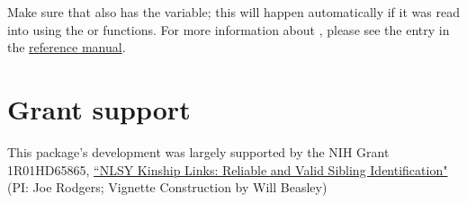 \documentclass{article}\usepackage[]{graphicx}\usepackage[]{color}
\begin{document}
Make sure that  also has the  variable; this will happen automatically if it was read into \R{} using the  or  functions.  For more information about , please see the  entry in the \href{http://cran.r-project.org/web/packages/NlsyLinks/NlsyLinks.pdf}{reference manual}.

\section{Grant support}
This package's development was largely supported by the NIH Grant 1R01HD65865, \href{http://taggs.hhs.gov/AwardDetail.cfm?s_Award_Num=R01HD065865&n_Prog_Office_Code=50}{``NLSY Kinship Links: Reliable and Valid Sibling Identification"} (PI: Joe Rodgers; Vignette Construction by Will Beasley)
\end{document}
